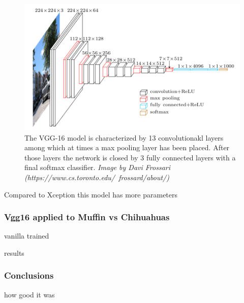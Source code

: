 \begin{figure}[h]
    \includegraphics[scale=0.7]{imgs/vgg_arch}
    \caption{
        The VGG-16 model is characterized by 13 convolutionakl layers among which at times a max pooling layer has been placed.
        After those layers the network is closed by 3 fully connected layers with a final softmax classifier.
        \textit{Image by Davi Frossari (https://www.cs.toronto.edu/~frossard/about/)}
    }\label{fig:vgg16}
\end{figure}

Compared to Xception this model has more parameters

\subsubsection{Vgg16 applied to Muffin vs Chihuahuas}

vanilla
trained

results

\subsubsection{Conclusions}
how good it was

